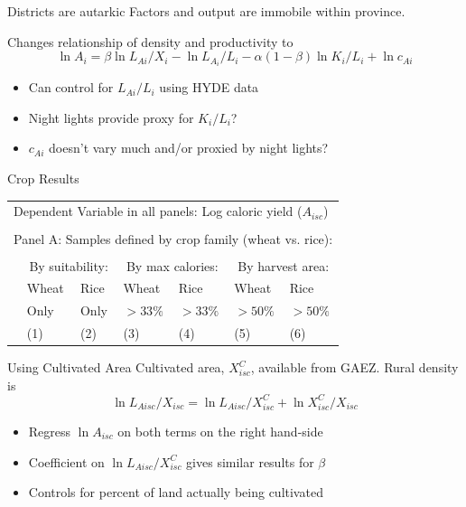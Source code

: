 \documentclass[10pt, xcolor=dvipsnames]{beamer}
\begin{document}
\begin{frame}{Districts are autarkic}\label{autarky}
Factors and output are immobile within province.

\vspace{.2cm} Changes relationship of density and productivity to
\begin{equation}
\ln A_i = \beta \ln L_{Ai}/X_i - \ln L_{A_i}/L_i - \alpha(1-\beta) \ln K_{i}/L_{i} + \ln c_{Ai} \nonumber
\end{equation}
\begin{itemize}
  \item Can control for $L_{Ai}/L_i$ using HYDE data
  \item Night lights provide proxy for $K_i/L_i$?
  \item $c_{Ai}$ doesn't vary much and/or proxied by night lights?
\end{itemize}

\hfill \hyperlink{robustness}{}
\end{frame}

\begin{frame}{Crop Results}

{\footnotesize
\begin{tabularx}{\textwidth}{lXXXXXX}
\midrule
\multicolumn{7}{l}{Dependent Variable in all panels: Log caloric yield ($A_{isc}$)} \\ \\
\multicolumn{7}{l}{Panel A: Samples defined by crop family (wheat vs. rice):} \\ \\
 & \multicolumn{2}{c}{By suitability:} & \multicolumn{2}{c}{By max calories:} & \multicolumn{2}{c}{By harvest area:}\\ \cmidrule(lr){2-3} \cmidrule(lr){4-5} \cmidrule(lr){6-7} 
 & Wheat & Rice & Wheat  & Rice  & Wheat  & Rice \\
 & Only & Only &  $>33\%$ & $>33\%$ & $>50\%$ & $>50\%$   \\
 & (1) & (2) & (3) & (4) & (5) & (6) \\
\midrule

\midrule
\end{tabularx}
}

\end{frame}

\begin{frame}{Using Cultivated Area}\label{cultreg}
Cultivated area, $X^C_{isc}$, available from GAEZ. Rural density is
\begin{equation}
  \ln L_{Aisc}/X_{isc} = \ln L_{Aisc}/X^C_{isc} + \ln X^C_{isc}/X_{isc}
\end{equation}

\begin{itemize}
  \item Regress $\ln A_{isc}$ on both terms on the right hand-side 
  \item Coefficient on $\ln L_{Aisc}/X^C_{isc}$ gives similar results for $\beta$
  \item Controls for percent of land actually being cultivated
\end{itemize}

\hfill \hyperlink{robustness}{}
\end{frame}
\end{document}
